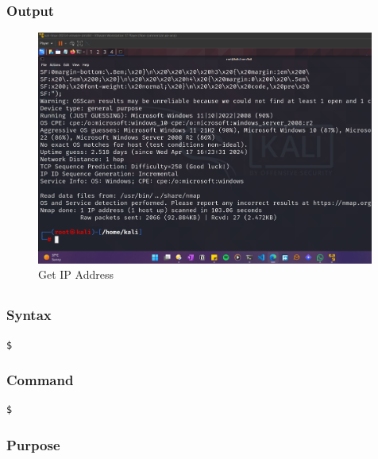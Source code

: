\documentclass[11pt]{article}
\begin{document}
\subsubsection*{Output}
\begin{figure}[H]
    \centering
    \includegraphics[width=0.99\textwidth]{a3_ss (4).png}
    \caption{Get IP Address}
    \label{fig:1}
\end{figure}
\subsection{}

\subsubsection*{Syntax}
\begin{verbatim}
$
\end{verbatim}

\subsubsection*{Command}
\begin{verbatim}
$
\end{verbatim}

\subsubsection*{Purpose}
\end{document}
